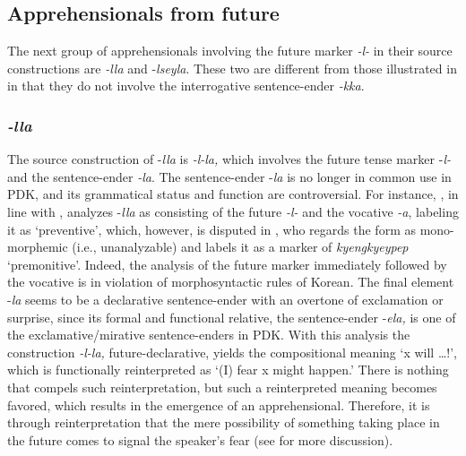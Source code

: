 \documentclass[output=paper,colorlinks,citecolor=brown]{langscibook}
\begin{document}
\subsection{Apprehensionals from future}
\label{subsec:future}

The next group of apprehensionals involving the future marker \textit{-l-} in their source constructions are \textit{-lla} and \nobreakdash-\textit{lseyla}. These two are different from those illustrated in  in that they do not involve the interrogative sentence-ender \textit{-kka}.

\subsubsection{\textit{-lla}}
\largerpage
The source construction of \nobreakdash-\textit{lla} is \textit{-l-la,} which involves the future tense marker \nobreakdash-\textit{l-} and the sentence-ender \textit{-la}. The sentence-ender \nobreakdash-\textit{la} is no longer in common use in PDK, and its grammatical status and function are controversial. For instance, \citet[85]{Ramstedt1997}, in line with \citet{Underwood1915}, analyzes \nobreakdash-\textit{lla} as consisting of the future \textit{-l-} and the vocative \textit{-a}, labeling it as `preventive', which, however, is disputed in \citet[293, 341--342]{Ko1989}, who regards the form as mono-morphemic (i.e., unanalyzable) and labels it as a marker of \textit{kyengkyeypep} `premonitive'. Indeed, the analysis of the future marker immediately followed by the vocative is in violation of morphosyntactic rules of Korean. The final element \nobreakdash-\textit{la} seems to be a declarative sentence-ender with an overtone of exclamation or surprise, since its formal and functional relative, the sentence-ender \nobreakdash-\textit{ela,} is one of the exclamative/mirative sentence-enders in PDK. With this analysis the construction \textit{-l-la,} future-declarative, yields the compositional meaning `x will …!', which is functionally reinterpreted as `(I) fear x might happen.' There is nothing that compels such reinterpretation, but such a reinterpreted meaning becomes favored, which results in the emergence of an apprehensional. Therefore, it is through reinterpretation that the mere possibility of something taking place in the future comes to signal the speaker's fear (see  for more discussion).
\end{document}

